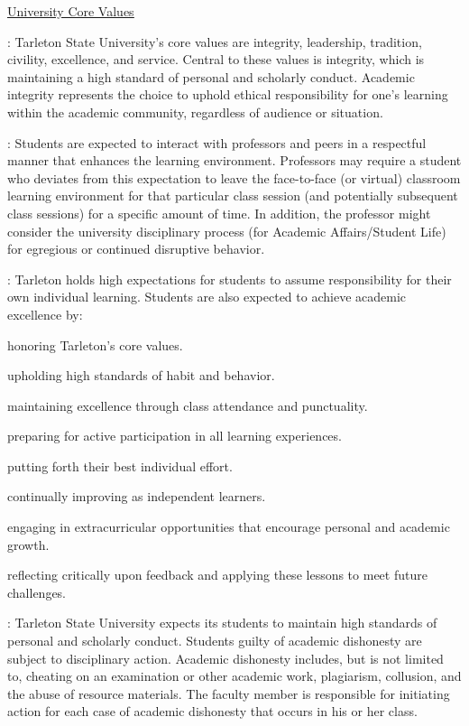 \documentclass[letterpaper]{article}
\begin{document}
\href{http://www.tarleton.edu/strategicplan/2016-2020/mission-vision.html}{\underline{University Core Values}}

:  Tarleton State University's core values are integrity, leadership, tradition, civility, excellence, and service.  Central to these values is integrity, which is maintaining a high standard of personal and scholarly conduct.  Academic integrity represents the choice to uphold ethical responsibility for one's learning within the academic community, regardless of audience or situation.

:  Students are expected to interact with professors and peers in a respectful manner that enhances the learning environment. Professors may require a student who deviates from this expectation to leave the face-to-face (or virtual) classroom learning environment for that particular class session (and potentially subsequent class sessions) for a specific amount of time. In addition, the professor might consider the university disciplinary process (for Academic Affairs/Student Life) for egregious or continued disruptive behavior.

:  Tarleton holds high expectations for students to assume responsibility for their own individual learning.  Students are also expected to achieve academic excellence by:
\bit
  \item honoring Tarleton's core values. 
  \item upholding high standards of habit and behavior.
  \item maintaining excellence through class attendance and punctuality.
  \item preparing for active participation in all learning experiences. 
  \item putting forth their best individual effort.
  \item continually improving as independent learners.
  \item engaging in extracurricular opportunities that encourage personal and academic growth.
  \item reflecting critically upon feedback and applying these lessons to meet future challenges.
\eit

:  Tarleton State University expects its students to maintain high standards of personal and scholarly conduct.  Students guilty of academic dishonesty are subject to disciplinary action.  Academic dishonesty includes, but is not limited to, cheating on an examination or other academic work, plagiarism, collusion, and the abuse of resource materials.  The faculty member is responsible for initiating action for each case of academic dishonesty that occurs in his or her class.
\end{document}
